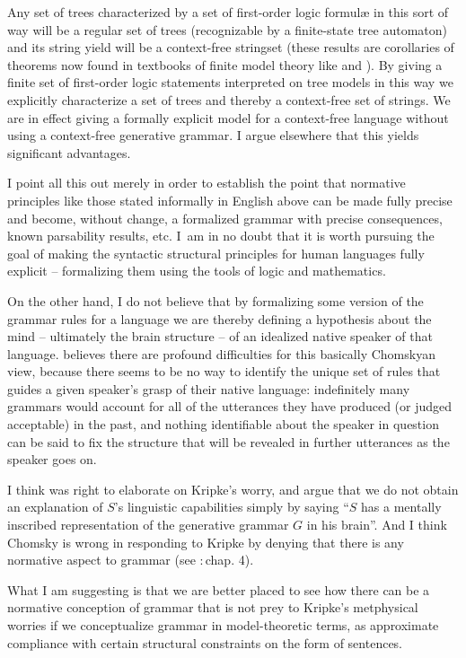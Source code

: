 \documentclass[output=paper]{langscibook}
\begin{document}
Any set of trees characterized by a set of first-order logic formul{\ae} in this sort of way will be a regular set of trees (recognizable by a finite-state tree automaton) and its string yield will be a context-free stringset (these results are corollaries of theorems now found in textbooks of finite model theory like \citealt{EbbiFlum99} and \citealt{Libkin04}). By giving a finite set of first-order logic statements interpreted on tree models in this way we explicitly characterize a set of trees and thereby a context-free set of strings.  We are in effect giving a formally explicit model for a context-free language without using a context-free generative grammar.  I argue elsewhere \citep{Pullum13} that this yields significant advantages.

I point all this out merely in order to establish the point that normative principles like those stated informally in English above can be made fully precise and become, without change, a formalized grammar with precise consequences, known parsability results, etc. I~am in no doubt that it is worth pursuing the goal of making the syntactic structural principles for human languages fully explicit – formalizing them using the tools of logic and mathematics.

On the other hand, I do not believe that by formalizing some version of the grammar rules for a language we are thereby defining a hypothesis about the mind – ultimately the brain structure – of an idealized native speaker of that language. \citet{Kripke82} believes there are profound difficulties for this basically Chomskyan view, because there seems to be no way to identify the unique set of rules that guides a given speaker's grasp of their native language: indefinitely many grammars would account for all of the utterances they have produced (or judged acceptable) in the past, and nothing identifiable about the speaker in question can be said to fix the structure that will be revealed in further utterances as the speaker goes on.

I think \citet{Scholz90} was right to elaborate on Kripke's worry, and argue that we do not obtain an explanation of $S$'s linguistic capabilities simply by saying ``$S$ has a mentally inscribed representation of the generative grammar $G$ in his brain''. And I think Chomsky is wrong in responding to Kripke by denying that there is any normative aspect to grammar (see \citealt{Chomsky86KL}:\,chap. 4).

What I am suggesting is that we are better placed to see how there can be a normative conception of grammar that is not prey to Kripke's metphysical worries if we conceptualize grammar in model-theoretic terms, as approximate compliance with certain structural constraints on the form of sentences.
\end{document}
